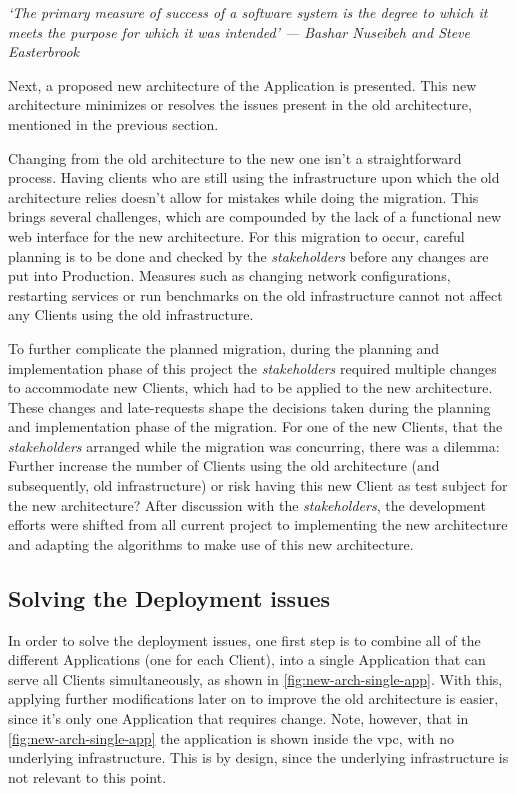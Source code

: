 \begin{displayquote}
\textit{`The primary measure of success of a software system is the degree to which it meets the purpose for which it was intended' --- Bashar Nuseibeh and Steve Easterbrook }
\end{displayquote}

Next, a proposed new architecture of the Application is presented. This new architecture minimizes or resolves the issues present in the old architecture, mentioned in the previous section.

Changing from the old architecture to the new one isn't a straightforward process. Having clients who are still using the infrastructure upon which the old architecture relies doesn't allow for mistakes while doing the migration. This brings several challenges, which are compounded by the lack of a functional new web interface for the new architecture. For this migration to occur, careful planning is to be done and checked by the \textit{stakeholders} before any changes are put into Production. Measures such as changing network configurations, restarting services or run benchmarks on the old infrastructure cannot not affect any Clients using the old infrastructure.

To further complicate the planned migration, during the planning and implementation phase of this project the \textit{stakeholders} required multiple changes to accommodate new Clients, which had to be applied to the new architecture. These changes and late-requests shape the decisions taken during the planning and implementation phase of the migration. For one of the new Clients, that the \textit{stakeholders} arranged while the migration was concurring, there was a dilemma: Further increase the number of Clients using the old architecture (and subsequently, old infrastructure) or risk having this new Client as test subject for the new architecture? After discussion with the \textit{stakeholders}, the development efforts were shifted from all current project to implementing the new architecture and adapting the algorithms to make use of this new architecture.


\subsection{Solving the Deployment issues}\label{methodology:ss:solving-the-deployment-issues}

In order to solve the deployment issues, one first step is to combine all of the different Applications (one for each Client), into a single Application that can serve all Clients simultaneously, as shown in \cref{fig:new-arch-single-app}. With this, applying further modifications later on to improve the old architecture is easier, since it's only one Application that requires change. Note, however, that in \cref{fig:new-arch-single-app} the application is shown inside the \gls{vpc}, with no underlying infrastructure. This is by design, since the underlying infrastructure is not relevant to this point.

